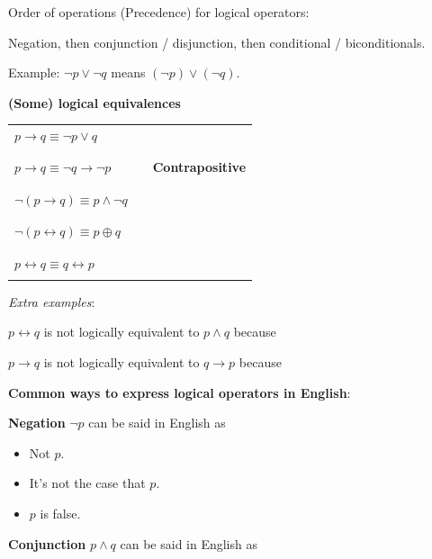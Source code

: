 \documentclass[12pt, oneside]{article}
\begin{document}
Order of operations (Precedence) for logical operators: 

Negation, then conjunction / disjunction, then conditional / biconditionals.

Example: $\lnot p \lor \lnot q$ means $(\lnot p) \lor (\lnot q)$.
 \newpage


{\bf (Some) logical equivalences}

\begin{tabular}{llp{3in}}
$p \to q \equiv \lnot p \lor q$ & & \\
&& \\
&& \\
$p \to q \equiv \lnot q \to \lnot p$ & &{\bf Contrapositive} \\
&& \\
&& \\
$\lnot (p \to q) \equiv p\land \lnot q$  & &\\
&& \\
&& \\
$\lnot( p \leftrightarrow q) \equiv p \oplus q$ && \\
&& \\
&& \\
$p \leftrightarrow q \equiv q \leftrightarrow p$ &&\\
&& \\
\end{tabular}

\vfill

{\it Extra examples}:

$p \leftrightarrow q$ is not logically equivalent to $p \land q$ because \underline{\phantom{\hspace{4in}}} 

$p \to q$ is not logically equivalent to $q \to p$ because \underline{\phantom{\hspace{4in}}} 
\vfill
 \newpage


{\bf Common ways to express logical operators in English}:

{\bf Negation} $\lnot p$ can be said in English as 

\vspace{-20pt}
\begin{itemize}
\item Not $p$.
\item It's not the case that $p$.
\item $p$ is false.
\end{itemize}

{\bf Conjunction} $p \land q$ can be said in English as
\end{document}
